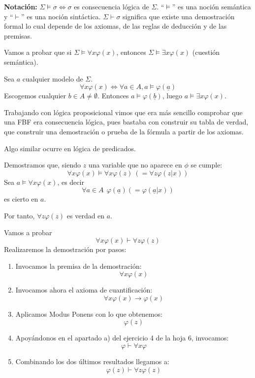 \noindent \textbf{Notación: } $\Sigma \vDash \sigma \iff \sigma $ es consecuencia lógica de $\Sigma$. ``$\vDash$'' es una noción semántica y ``$\vdash$'' es una noción sintáctica. $\Sigma \vdash \sigma$ significa que existe una demostración formal lo cual depende de los axiomas, de las reglas de deducción y de las premisas.

\begin{example}
	Vamos a probar que si $\Sigma\vDash \forall x \varphi(x)$, entonces $\Sigma \vDash \exists x\varphi(x)$ (cuestión semántica). 

	Sea $a$ cualquier modelo de $\Sigma$. 
	\[\forall x\varphi(x) \iff \forall a\in A, a\vDash \varphi(\underline{a})\] Escogemos cualquier $b\in A\neq \emptyset$. Entonces $a\vDash \varphi(\underline{b})$, luego $a\vDash \exists x \varphi(x)$.
\end{example}

Trabajando con lógica proposicional vimos que era más sencillo comprobar que una FBF era consecuencia lógica, pues bastaba con construir su tabla de verdad, que construir una demostración o prueba de la fórmula a partir de los axiomas.

Algo similar ocurre en lógica de predicados. 
\begin{example}
Demostramos que, siendo $z$ una variable que no aparece en $\phi$ se cumple:
\[\forall x \varphi(x) \vDash \forall x \varphi(z) \ \left(= \forall z \varphi(z|x)\right)\]
Sea $a\vDash \forall x \varphi(x)$, es decir
\[\forall a \in A \ \ \varphi(\underline{a})\left(= \varphi(\underline{a}|x)\right)\]
es cierto en $a$.

Por tanto, $\forall z \varphi(z)$ es verdad en $a$.
\end{example}

\begin{example}
Vamos a probar
\[\forall x \varphi(x) \vdash \forall z \varphi(z)\]
Realizaremos la demostración por pasos:
\begin{enumerate}
\item Invocamos la premisa de la demostración:
\[\forall x \varphi(x)\]

\item Invocamos ahora el axioma de cuantificación:
\[\forall x \varphi(x) \to \varphi(x)\]

\item Aplicamos Modus Ponens con lo que obtenemos:
\[\varphi(z)\]

\item Apoyándonos en el apartado a) del ejercicio 4 de la hoja 6, invocamos:
\[\varphi \vdash \forall x \varphi\]

\item Combinando los dos últimos resultados llegamos a:
\[\varphi(z) \vdash \forall z \varphi(z)\]
\end{enumerate}

\end{example}

